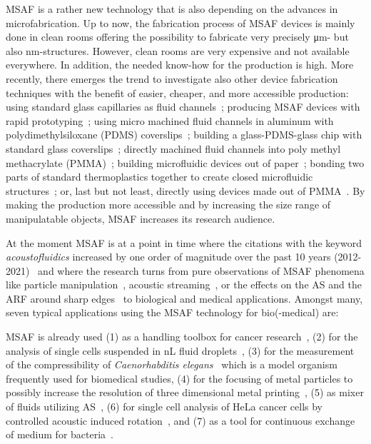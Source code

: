 MSAF is a rather new technology that is also depending on the advances in 
microfabrication. Up to now, the fabrication process of MSAF devices is mainly 
done in clean rooms offering the possibility to fabricate very precisely 
\si{\um}- but also \si{\nm}-structures. However, clean rooms are very expensive 
and not available everywhere. In addition, the needed know-how for the 
production is high. More recently, there emerges the trend to investigate also 
other device fabrication techniques with the benefit of easier, cheaper, and 
more accessible production: using standard glass capillaries as fluid 
channels~\cite{Wiklund2001,Hammarstrom2010,Hammarstrom2012,Mishra2014,Gralinski2014,Gerlt2022}; 
producing MSAF devices with rapid prototyping~\cite{Adams2012}; using micro 
machined fluid channels in aluminum with polydimethylsiloxane (PDMS) 
coverslips~\cite{Gautam2018}; building a glass-PDMS-glass chip with standard 
glass coverslips~\cite{Xu2019}; directly machined fluid channels into poly 
methyl methacrylate (PMMA)~\cite{Harris2012}; building microfluidic devices out 
of paper~\cite{Martinez2010}; bonding two parts of standard thermoplastics 
together to create closed microfluidic structures~\cite{Mueller2013}; or, last 
but not least, directly using devices made out of 
PMMA~\cite{Gonzalez2015,Yang2017}. By making the production more accessible and 
by increasing the size range of manipulatable objects, MSAF increases its 
research audience.

At the moment MSAF is at a point in time where the citations with the keyword 
\emph{acoustofluidics} increased by one order of magnitude over the past 10 
years (2012-2021)~\cite{Novotny2021} and where the research turns from pure 
observations of MSAF phenomena like particle 
manipulation~\cite{Wiklund2012a,Laurell2007,Collins2016,Gedge2012,Ding2012b,Cetin2016b,Aubert2016,Novotny2021}, 
acoustic streaming~\cite{Hoyos2013,Castro2016,Lei2016}, or the effects on the 
AS and the ARF around sharp 
edges~\cite{Leibacher2015,Chen2021,Doinikov2020,Doinikov2020b} to biological 
and medical applications. Amongst many, seven typical applications using the 
MSAF technology for bio(-medical) are:

MSAF is already used (1) as a handling toolbox for cancer 
research~\cite{Antfolk2015,Wu2021,Wang2020,Nguyen2021}, (2) for the analysis of 
single cells suspended in \si{\nano\liter} fluid droplets~\cite{Gerlt2020a}, (3) for 
the measurement of the compressibility of \emph{Caenorhabditis 
elegans}~\cite{Baasch2018} which is a model organism frequently used for 
biomedical studies, (4) for the focusing of metal particles to possibly 
increase the resolution of three dimensional metal printing~\cite{Gerlt2022}, 
(5) as mixer of fluids utilizing 
AS~\cite{Patel2014,Ozcelik2014,Bachman2020,Zhang2021}, (6) for single cell 
analysis of HeLa cancer cells by controlled acoustic induced 
rotation~\cite{Laeubli2021}, and (7) as a tool for continuous exchange of 
medium for bacteria~\cite{Gerlt2021}.

